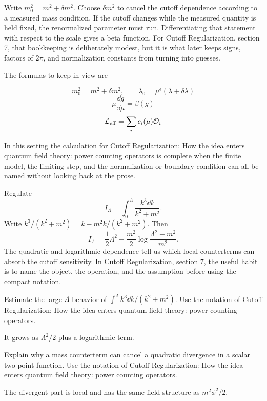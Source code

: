 Write \(m_0^2=m^2+\delta m^2\).  Choose \(\delta m^2\) to cancel the cutoff dependence according to a measured mass condition.  If the cutoff changes while the measured quantity is held fixed, the renormalized parameter must run.  Differentiating that statement with respect to the scale gives a beta function.  For Cutoff Regularization, section 7, that bookkeeping is deliberately modest, but it is what later keeps signs, factors of \(2\pi\), and normalization constants from turning into guesses.

The formulas to keep in view are

\[
  m_0^2=m^2+\delta m^2,\qquad \lambda_0=\mu^\epsilon(\lambda+\delta\lambda)
\]
\[
  \mu\frac{\dd g}{\dd\mu}=\beta(g)
\]
\[
  \mathcal L_{\mathrm{eff}}=\sum_i c_i(\mu)\mathcal O_i
\]

In this setting the calculation for Cutoff Regularization: How the idea enters quantum field theory: power counting operators is complete when the finite model, the limiting step, and the normalization or boundary condition can all be named without looking back at the prose.




\begin{example}
Regulate
\[
  I_\Lambda=\int_0^\Lambda\frac{k^3\dd k}{k^2+m^2}.
\]
Write \(k^3/(k^2+m^2)=k-m^2k/(k^2+m^2)\).  Then
\[
  I_\Lambda=\frac12\Lambda^2-\frac{m^2}{2}\log\frac{\Lambda^2+m^2}{m^2}.
\]
The quadratic and logarithmic dependence tell us which local counterterms can absorb the cutoff sensitivity.  In Cutoff Regularization, section 7, the useful habit is to name the object, the operation, and the assumption before using the compact notation.
\end{example}



\begin{exercise}
Estimate the large-\(\Lambda\) behavior of \(\int^\Lambda k^3\dd k/(k^2+m^2)\).  Use the notation of Cutoff Regularization: How the idea enters quantum field theory: power counting operators.
\begin{answer}
It grows as \(\Lambda^2/2\) plus a logarithmic term.
\end{answer}
\end{exercise}

\begin{exercise}
Explain why a mass counterterm can cancel a quadratic divergence in a scalar two-point function.  Use the notation of Cutoff Regularization: How the idea enters quantum field theory: power counting operators.
\begin{answer}
The divergent part is local and has the same field structure as \(m^2\phi^2/2\).
\end{answer}
\end{exercise}



